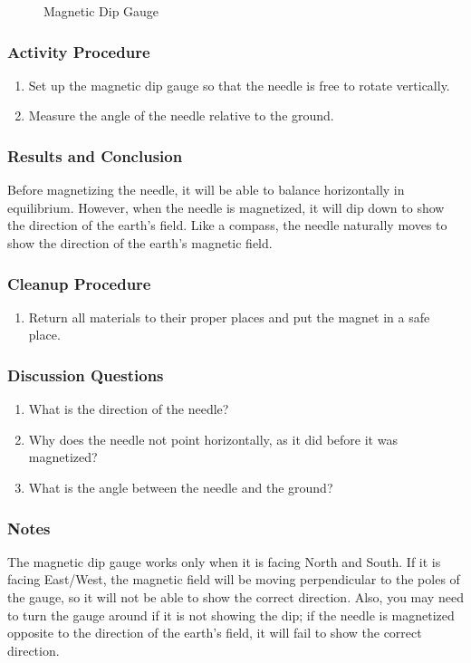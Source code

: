 \begin{figure}
\begin{center}
\def\svgwidth{150pt}

\caption{Magnetic Dip Gauge}
\label{fig:magnetic-dip-gauge}
\end{center}
\end{figure}

\subsubsection*{Activity Procedure}
\begin{enumerate}
\item{Set up the magnetic dip gauge so that the needle is free to rotate vertically.}
\item{Measure the angle of the needle relative to the ground.}
\end{enumerate}

\subsubsection*{Results and Conclusion}
Before magnetizing the needle, it will be able to balance horizontally in equilibrium.  However, when the needle is magnetized, it will dip down to show the direction of the earth's field.  Like a compass, the needle naturally moves to show the direction of the earth's magnetic field.

\subsubsection*{Cleanup Procedure}
\begin{enumerate}
\item{Return all materials to their proper places and put the magnet in a safe place.}
\end{enumerate}

\subsubsection*{Discussion Questions}
\begin{enumerate}
\item{What is the direction of the needle?}
\item{Why does the needle not point horizontally, as it did before it was magnetized?}
\item{What is the angle between the needle and the ground?}
\end{enumerate}

\subsubsection*{Notes}
The magnetic dip gauge works only when it is facing North and South.  If it is facing East/West, the magnetic field will be moving perpendicular to the poles of the gauge, so it will not be able to show the correct direction.  Also, you may need to turn the gauge around if it is not showing the dip; if the needle is magnetized opposite to the direction of the earth's field, it will fail to show the correct direction.
